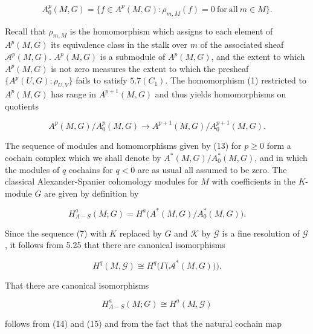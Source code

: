 \begin{equation}
\tag{12}\label{eq:5.26:12}
A_{0}^{p}(M,G)=\{f\in A^{p}(M,G)\colon\rho_{m,M}(f)=0\ \mathrm{for\ all}\ m\in M\}.
\end{equation}

Recall that  $ \rho_{m,M} $ is the homomorphism which assigns to each element of  $ A^{p}(M,G) $ its equivalence class in the stalk over  $ m $ of the associated sheaf  $ \mathcal{A}^{p}(M,G) $.  $ A^{p}(M,G) $ is a submodule of  $ A^{p}(M,G) $, and the extent to which  $ A^{p}(M,G) $ is not zero measures the extent to which the presheaf  $ \{A^{p}(U,G);\rho_{U,V}\} $ fails to satisfy  $ 5.7(C_1) $. The homomorphism (1) restricted to  $ A^{p}(M,G) $ has range in  $ A^{p+1}(M,G) $ and thus yields homomorphisms on quotients

\begin{equation}
\tag{13}\label{eq:5.26:13}
A^{p}(M,G)/A_{0}^{p}(M,G)\to A^{p+1}(M,G)/A_{0}^{p+1}(M,G).
\end{equation}

The sequence of modules and homomorphisms given by (13) for $p \geq 0$ form a cochain complex which we shall denote by $A^*(M,G)/A_0^*(M,G)$, and in which the modules of $q$ cochains for $q < 0$ are as usual all assumed to be zero. The classical Alexander-Spanier cohomology modules for $M$ with coefficients in the $K$-module $G$ are given by definition by

\begin{equation}
\tag{14}\label{eq:5.26:14}
H_{A-S}^{a}(M;G)=H^{a}\big(A^{*}(M,G)/A_{0}^{*}(M,G)\big).
\end{equation}

Since the sequence (7) with $K$ replaced by $G$ and $\mathcal{K}$ by $\mathcal{G}$ is a fine resolution of $\mathcal{G}$, it follows from 5.25 that there are canonical isomorphisms

\begin{equation}
\tag{15}\label{eq:5.26:15}
H^{q}(M,\mathcal{G})\cong H^{q}\big(\Gamma\big(\mathcal{A}^{*}(M,G)\big)\big).
\end{equation}

That there are canonical isomorphisms

\begin{equation}
\tag{16}\label{eq:5.26:16}
H_{A-S}^{a}(M;G)\cong H^{a}(M,\mathcal{G})
\end{equation}

follows from (14) and (15) and from the fact that the natural cochain map

